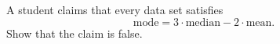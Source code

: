 A student claims that every data set satisfies
\[
\text{mode}=3\cdot\text{median}-2\cdot\text{mean}.
\]
Show that the claim is false.
